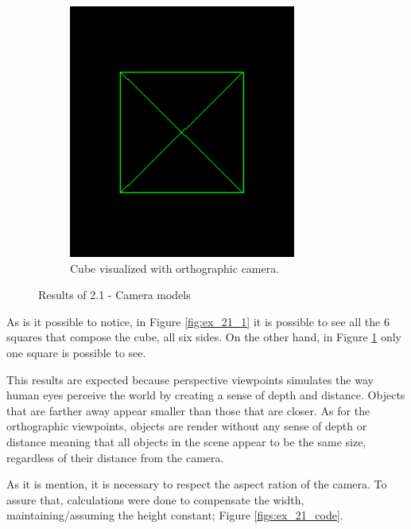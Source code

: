 \documentclass[12pt]{article}
\begin{document}
\begin{figure}[!h]
\begin{subfigure}{.5\textwidth}
        \centering
        \includegraphics[width = \textwidth]{figs/ex_21_2.png}
        \caption{Cube visualized with orthographic camera.}
        \label{fig:ex_21_2}
    \end{subfigure}
\caption{Results of 2.1 - Camera models}
\label{fig:ex_21}
\end{figure}

As is it possible to notice, in Figure \ref{fig:ex_21_1} it is possible to see all the 6 squares that compose the cube, all six sides. On the other hand, in Figure \ref{fig:ex_21_2} only one square is possible to see.\par

This results are expected because perspective viewpoints simulates the way human eyes perceive the world by creating a sense of depth and distance. Objects that are farther away appear smaller than those that are closer. \newline
As for the orthographic viewpoints, objects are render without any sense of depth or distance meaning that all objects in the scene appear to be the same size, regardless of their distance from the camera.\par

As it is mention, it is necessary to respect the aspect ration of the camera. To assure that, calculations were done to compensate the width, maintaining/assuming the height constant; Figure \ref{figs:ex_21_code}.
\end{document}
